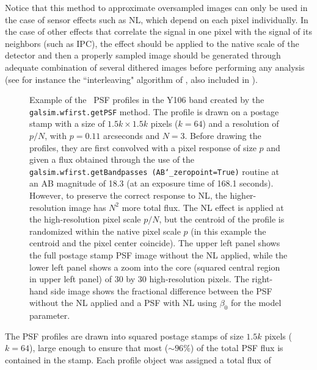 \documentclass[preprint]{aastex}
\begin{document}

Notice that this method to approximate oversampled images can only be used in the case of sensor effects such as NL, which depend on each pixel individually. In the case of other effects that correlate the signal in one pixel with the signal of its neighbors (such as IPC), the effect should be applied to the native scale of the detector and then a properly sampled image should be generated through adequate combination of several dithered images before performing any analysis (see for instance the ``interleaving" algorithm of \citealt{kannawadi15}, also included in \gs). 

\begin{figure}[!ht]
\centering
{}
\caption{Example of the \wfa\ PSF profiles in the Y106 band created by the {\tt{galsim.wfirst.getPSF}} method. The profile is drawn on a postage stamp with a size of $1.5k \times1.5k$ pixels ($k=64$) and a resolution of $p/N$, with $p=0.11$ arcseconds and $N=3$. Before drawing the profiles, they are first convolved with a pixel response of size $p$ and given a flux obtained through the use of the {\tt{galsim.wfirst.getBandpasses (AB\char`_zeropoint=True)}} routine at an AB magnitude of 18.3 (at an exposure time of 168.1 seconds). However, to preserve the correct response to NL, the higher-resolution image has $N^2$ more total flux. The NL effect is applied at the high-resolution pixel scale $p/N$, but the centroid of the profile is randomized within the native pixel scale $p$ (in this example the centroid and the pixel center coincide). The upper left panel shows the full postage stamp PSF image without the NL applied, while the lower left panel shows a zoom into the core (squared central region in upper left panel) of 30 by 30 high-resolution pixels. The right-hand side image shows the fractional difference between the PSF without the NL applied and a PSF with NL using $\beta_0$ for the model parameter.} 
\label{f1}
\end{figure}

The PSF profiles are drawn into squared postage stamps of size $1.5k$ pixels ($k=64$), large enough to ensure that most ($\sim 96\%$) of the total PSF flux is contained in the stamp. %
Each profile object was assigned a total flux of 
\end{document}
